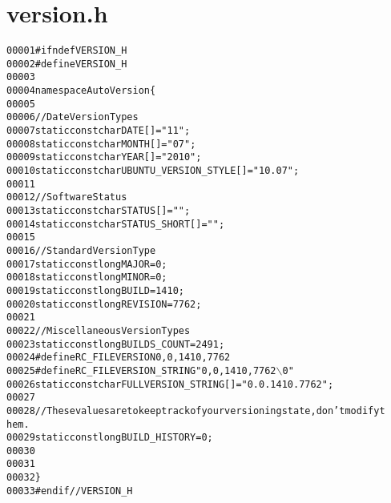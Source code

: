 \hypertarget{version_8h_source}{
\section{version.h}
}


\begin{footnotesize}\begin{alltt}
00001 \textcolor{preprocessor}{#ifndef VERSION\_H}
00002 \textcolor{preprocessor}{}\textcolor{preprocessor}{#define VERSION\_H}
00003 \textcolor{preprocessor}{}
00004 \textcolor{keyword}{namespace }AutoVersion\{
00005         
00006         \textcolor{comment}{//Date Version Types}
00007         \textcolor{keyword}{static} \textcolor{keyword}{const} \textcolor{keywordtype}{char} DATE[] = \textcolor{stringliteral}{"11"};
00008         \textcolor{keyword}{static} \textcolor{keyword}{const} \textcolor{keywordtype}{char} MONTH[] = \textcolor{stringliteral}{"07"};
00009         \textcolor{keyword}{static} \textcolor{keyword}{const} \textcolor{keywordtype}{char} YEAR[] = \textcolor{stringliteral}{"2010"};
00010         \textcolor{keyword}{static} \textcolor{keyword}{const} \textcolor{keywordtype}{char} UBUNTU\_VERSION\_STYLE[] = \textcolor{stringliteral}{"10.07"};
00011         
00012         \textcolor{comment}{//Software Status}
00013         \textcolor{keyword}{static} \textcolor{keyword}{const} \textcolor{keywordtype}{char} STATUS[] = \textcolor{stringliteral}{""};
00014         \textcolor{keyword}{static} \textcolor{keyword}{const} \textcolor{keywordtype}{char} STATUS\_SHORT[] = \textcolor{stringliteral}{""};
00015         
00016         \textcolor{comment}{//Standard Version Type}
00017         \textcolor{keyword}{static} \textcolor{keyword}{const} \textcolor{keywordtype}{long} MAJOR = 0;
00018         \textcolor{keyword}{static} \textcolor{keyword}{const} \textcolor{keywordtype}{long} MINOR = 0;
00019         \textcolor{keyword}{static} \textcolor{keyword}{const} \textcolor{keywordtype}{long} BUILD = 1410;
00020         \textcolor{keyword}{static} \textcolor{keyword}{const} \textcolor{keywordtype}{long} REVISION = 7762;
00021         
00022         \textcolor{comment}{//Miscellaneous Version Types}
00023         \textcolor{keyword}{static} \textcolor{keyword}{const} \textcolor{keywordtype}{long} BUILDS\_COUNT = 2491;
00024 \textcolor{preprocessor}{        #define RC\_FILEVERSION 0,0,1410,7762}
00025 \textcolor{preprocessor}{}\textcolor{preprocessor}{        #define RC\_FILEVERSION\_STRING "0, 0, 1410, 7762\(\backslash\)0"}
00026 \textcolor{preprocessor}{}        \textcolor{keyword}{static} \textcolor{keyword}{const} \textcolor{keywordtype}{char} FULLVERSION\_STRING[] = \textcolor{stringliteral}{"0.0.1410.7762"};
00027         
00028         \textcolor{comment}{//These values are to keep track of your versioning state, don't modify t
      hem.}
00029         \textcolor{keyword}{static} \textcolor{keyword}{const} \textcolor{keywordtype}{long} BUILD\_HISTORY = 0;
00030         
00031 
00032 \}
00033 \textcolor{preprocessor}{#endif //VERSION\_H}
\end{alltt}\end{footnotesize}
